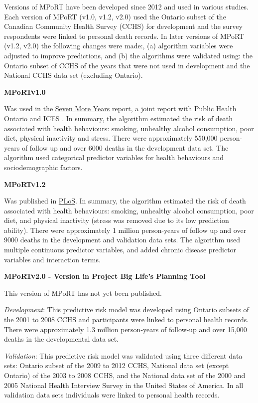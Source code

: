 \documentclass[]{book}
\begin{document}
Versions of MPoRT have been developed since 2012 and used in various studies. Each version of MPoRT (v1.0, v1.2, v2.0) used the Ontario subset of the Canadian Community Health Survey (CCHS) for development and the survey respondents were linked to personal death records. In later versions of MPoRT (v1.2, v2.0) the following changes were made:, (a) algorithm variables were adjusted to improve predictions, and (b) the algorithms were validated using: the Ontario subset of CCHS of the years that were not used in development and the National CCHS data set (excluding Ontario).

\textbf{MPoRTv1.0}

Was used in the \href{https://www.ices.on.ca/Publications/Atlases-and-Reports/2012/Seven-More-Years}{Seven More Years} report, a joint report with Public Health Ontario and ICES .
In summary, the algorithm estimated the risk of death associated with health behaviours: smoking, unhealthy alcohol consumption, poor diet, physical inactivity and stress. There were approximately 550,000 person-years of follow up and over 6000 deaths in the development data set. The algorithm used categorical predictor variables for health behaviours and sociodemographic factors.

\textbf{MPoRTv1.2}

Was published in \href{https://journals.plos.org/plosmedicine/article?id=10.1371/journal.pmed.1002082}{PLoS}.
In summary, the algorithm estimated the risk of death associated with health behaviours: smoking, unhealthy alcohol consumption, poor diet, and physical inactivity (stress was removed due to its low prediction ability). There were approximately 1 million person-years of follow up and over 9000 deaths in the development and validation data sets. The algorithm used multiple continuous predictor variables, and added chronic disease predictor variables and interaction terms.

\textbf{MPoRTv2.0 - Version in Project Big Life's Planning Tool}

This version of MPoRT has not yet been published.

\emph{Development}: This predictive risk model was developed using Ontario subsets of the 2001 to 2008 CCHS and participants were linked to personal health records. There were approximately 1.3 million person-years of follow-up and over 15,000 deaths in the developmental data set.

\emph{Validation}: This predictive risk model was validated using three different data sets: Ontario subset of the 2009 to 2012 CCHS, National data set (except Ontario) of the 2003 to 2008 CCHS, and the National data set of the 2000 and 2005 National Health Interview Survey in the United States of America. In all validation data sets individuals were linked to personal health records.
\end{document}
